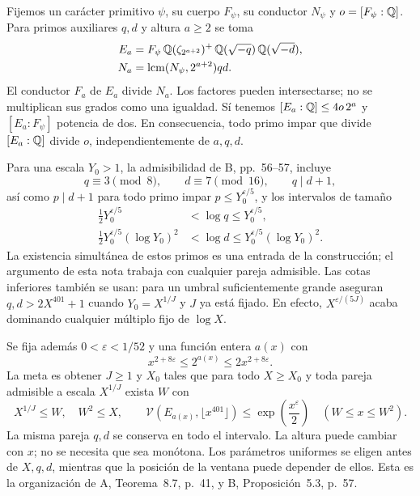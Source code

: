 Fijemos un carácter primitivo $\psi$, su cuerpo $F_\psi$,
su conductor $N_\psi$ y $o=[F_\psi:\mathbb{Q}]$.
Para primos auxiliares $q,d$ y altura $a\ge2$ se toma
\begin{equation}
 \begin{aligned}
 E_a&=F_\psi\,\mathbb{Q}(\zeta_{2^{a+2}})^+\,
          \mathbb{Q}(\sqrt{-q})\,\mathbb{Q}(\sqrt{-d}),\\
 N_a&=\operatorname{lcm}(N_\psi,2^{a+2})qd.
 \end{aligned}
 \label{eq:cohom-campos}
\end{equation}
El conductor $F_a$ de $E_a$ divide $N_a$.
Los factores pueden intersectarse; no se multiplican sus
grados como una igualdad. Sí tenemos
$[E_a:\mathbb{Q}]\le 4o\,2^a$ y
$[E_a:F_\psi]$ potencia de dos.
En consecuencia, todo primo impar que divide $[E_a:\mathbb{Q}]$
divide $o$, independientemente de $a,q,d$.

Para una escala $Y_0>1$, la admisibilidad de B, pp.~56--57,
incluye
\[
 q\equiv3\pmod8,\qquad d\equiv7\pmod{16},\qquad q\mid d+1,
\]
así como $p\mid d+1$ para todo primo impar
$p\le Y_0^{\varepsilon/5}$, y los intervalos de tamaño
\begin{equation}
 \begin{aligned}
 \tfrac12Y_0^{\varepsilon/5}
   &<\log q\le Y_0^{\varepsilon/5},\\
 \tfrac12Y_0^{\varepsilon/5}(\log Y_0)^2
   &<\log d\le Y_0^{\varepsilon/5}(\log Y_0)^2.
 \end{aligned}
 \label{eq:cohom-primos}
\end{equation}
La existencia simultánea de estos primos es una entrada
de la construcción; el argumento de esta nota trabaja con
cualquier pareja admisible.
Las cotas inferiores también se usan: para un umbral
suficientemente grande aseguran $q,d>2X^{401}+1$ cuando
$Y_0=X^{1/J}$ y $J$ ya está fijado.
En efecto, $X^{\varepsilon/(5J)}$ acaba dominando
cualquier múltiplo fijo de $\log X$.

Se fija además $0<\varepsilon<1/52$ y una función entera
$a(x)$ con
\begin{equation}
 x^{2+8\varepsilon}\le2^{a(x)}
       \le2x^{2+8\varepsilon}.
 \label{eq:cohom-altura}
\end{equation}
La meta es obtener $J\ge1$ y $X_0$ tales que para todo
$X\ge X_0$ y toda pareja admisible a escala $X^{1/J}$
exista $W$ con
\begin{equation}
 X^{1/J}\le W,\quad W^2\le X,\qquad
 \mathcal V(E_{a(x)},\lfloor x^{401}\rfloor)
 \le \exp\!\left(\frac{x^\varepsilon}{2}\right)
 \quad(W\le x\le W^2).
 \label{eq:cohom-meta}
\end{equation}
La misma pareja $q,d$ se conserva en todo el intervalo.
La altura puede cambiar con $x$; no se necesita que sea
monótona. Los parámetros uniformes se eligen antes de
$X,q,d$, mientras que la posición de la ventana puede
depender de ellos. Esta es la organización de A,
Teorema~8.7, p.~41, y B, Proposición~5.3, p.~57.

